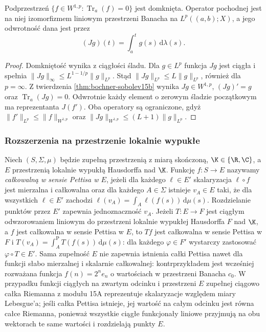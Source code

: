 \begin{wniosek}
\label{cor:bochner-sobolev-zero-trace15b}
Podprzestrzeń $\{f\in W^{1,p}:\operatorname{Tr}_a(f)=0\}$
jest domknięta. Operator pochodnej jest na niej
izomorfizmem liniowym przestrzeni Banacha na
$L^p((a,b);X)$, a jego odwrotność dana jest przez
\[
 (Jg)(t)=\int_a^t g(s)\,\mathrm d\lambda(s).
\]
\end{wniosek}
\begin{proof}
Domkniętość wynika z ciągłości śladu.
Dla $g\in L^p$ funkcja $Jg$ jest ciągła i spełnia
$\|Jg\|_\infty\le L^{1-1/p}\|g\|_{L^p}$.
Stąd $\|Jg\|_{L^p}\le L\|g\|_{L^p}$, również dla
$p=\infty$. Z twierdzenia \ref{thm:bochner-sobolev15b}
wynika $Jg\in W^{1,p}$, $(Jg)'=g$ oraz
$\operatorname{Tr}_a(Jg)=0$.
Odwrotnie każdy element o zerowym śladzie
początkowym ma reprezentanta $J(f')$.
Oba operatory są ograniczone, gdyż
$\|f'\|_{L^p}\le\|f\|_{W^{1,p}}$ oraz
$\|Jg\|_{W^{1,p}}\le(L+1)\|g\|_{L^p}$.
\end{proof}

\subsubsection{Rozszerzenia na przestrzenie lokalnie wypukłe}

\begin{uwaga}
\label{rem:lcs-pettis15b}
Niech $(S,\Sigma,\mu)$ będzie zupełną przestrzenią
z miarą skończoną, $\K\in\{\R,\C\}$, a $E$ przestrzenią
lokalnie wypukłą Hausdorffa nad $\K$. Funkcję $f:S\to E$
nazywamy \emph{całkowalną w sensie Pettisa w $E$},
jeżeli dla każdego $\ell\in E'$ skalaryzacja $\ell\circ f$
jest mierzalna i całkowalna oraz dla każdego $A\in\Sigma$
istnieje $v_A\in E$ taki, że dla wszystkich $\ell\in E'$
zachodzi $\ell(v_A)=\int_A\ell(f(s))\,\mathrm d\mu(s)$.
Rozdzielanie punktów przez $E'$ zapewnia jednoznaczność
$v_A$. Jeżeli $T:E\to F$ jest ciągłym odwzorowaniem liniowym
do przestrzeni lokalnie wypukłej Hausdorffa $F$ nad $\K$,
a $f$ jest całkowalna w sensie Pettisa w $E$,
to $Tf$ jest całkowalna w sensie Pettisa w $F$ i
$T(v_A)=\int_A^{\mathrm P} T(f(s))\,\mathrm d\mu(s)$:
dla każdego $\varphi\in F'$ wystarczy zastosować
$\varphi\circ T\in E'$. Sama zupełność $E$ nie zapewnia istnienia całki Pettisa
nawet dla funkcji słabo mierzalnej i skalarnie całkowalnej:
kontrprzykładem jest wcześniej rozważana funkcja
$f(n)=2^ne_n$ o wartościach w przestrzeni Banacha $c_0$.
W przypadku funkcji ciągłych na zwartym odcinku
i przestrzeni $E$ zupełnej ciągowo całka Riemanna
z modułu 15A reprezentuje skalaryzacje względem
miary Lebesgue'a; jeśli całka Pettisa istnieje,
jej wartość na całym odcinku jest równa całce Riemanna,
ponieważ wszystkie ciągłe funkcjonały liniowe przyjmują
na obu wektorach te same wartości i rozdzielają punkty $E$.
\end{uwaga}

